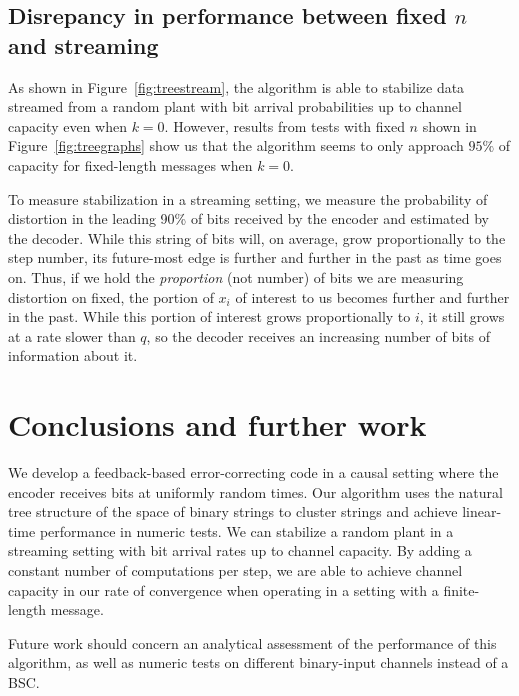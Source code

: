 \documentclass{IEEEtran}
\begin{document}
\subsection{Disrepancy in performance between fixed $n$ and streaming}
As shown in Figure~\ref{fig:treestream}, the algorithm is able to stabilize
data streamed from a random plant with bit arrival probabilities up to
channel capacity even when $k=0$.
However, results from tests with fixed $n$ shown in
Figure~\ref{fig:treegraphs} show us that the algorithm seems to only
approach $95\%$ of capacity for fixed-length messages when $k=0$.

To measure stabilization in a streaming setting, we measure the probability
of distortion in the leading 90\% of bits received by the encoder and
estimated by the decoder. While this string of bits will, on average, grow
proportionally to the step number, its future-most edge is further and further
in the past as time goes on.
Thus, if we hold the \textit{proportion} (not number)
of bits we are measuring distortion on fixed, the portion of $x_i$ of interest
to us becomes further and further in the past. While this portion of interest
grows proportionally to $i$, it still grows at a rate slower than $q$,
so the decoder receives an increasing
number of bits of information about it.

\section{Conclusions and further work}
We develop a feedback-based error-correcting code in a causal setting where
the encoder receives bits at uniformly random times. Our algorithm uses the
natural tree structure of the space of binary strings to cluster strings and
achieve linear-time performance in numeric tests. We can stabilize a random
plant in a streaming setting with bit arrival rates up to channel capacity.
By adding a constant number
of computations per step, we are able to achieve channel capacity in our rate
of convergence when operating in a setting with a finite-length message.

Future work should concern an analytical assessment of the performance of
this algorithm, as well as numeric tests on different binary-input channels
instead of a BSC.


\end{document}
